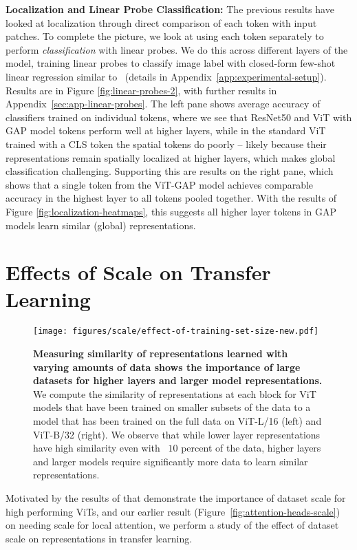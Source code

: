 \documentclass{article}
\begin{document}
\textbf{Localization and Linear Probe Classification:}
The previous results have looked at localization through direct comparison of each token with input patches. To complete the picture, we look at using each token separately to perform \textit{classification} with linear probes. We do this across different layers of the model, training linear probes to classify image label with closed-form few-shot linear regression similar to~\citet{dosovitskiy2020image} (details in Appendix~\ref{app:experimental-setup}). Results are in Figure \ref{fig:linear-probes-2}, with further results in Appendix~\ref{sec:app-linear-probes}.
The left pane shows average accuracy of classifiers trained on individual tokens, where we see that ResNet50 and ViT with GAP model tokens perform well at higher layers, while in the standard ViT trained with a CLS token the spatial tokens do poorly -- likely because their representations remain spatially localized at higher layers, which makes global classification challenging. Supporting this are results on the right pane, which shows that a single token from the ViT-GAP model achieves comparable accuracy in the highest layer to all tokens pooled together. With the results of Figure \ref{fig:localization-heatmaps}, this suggests all higher layer tokens in GAP models learn similar (global) representations.

\vspace{-0.75em}
\section{Effects of Scale on Transfer Learning}
\vspace{-0.25em}
\label{sec:transfer-learning}
\begin{figure}
    \centering
    \texttt{[image: figures/scale/effect-of-training-set-size-new.pdf]} 
    \vspace{-0.5em}
    \caption{\small \textbf{Measuring similarity of representations learned with varying amounts of data shows the importance of large datasets for higher layers and larger model representations.} We compute the similarity of representations at each block for ViT models that have been trained on smaller subsets of the data to a model that has been trained on the full data on ViT-L/16 (left) and ViT-B/32 (right). We observe that while lower layer representations have high similarity even with ~$10$ percent of the data, higher layers and larger models require significantly more data to learn similar representations.}
    \label{fig:training-set-size}
    \vspace{-1em}
\end{figure}
Motivated by the results of \citet{dosovitskiy2020image} that demonstrate the importance of dataset scale for high performing ViTs, and our earlier result (Figure~\ref{fig:attention-heads-scale}) on needing scale for local attention, we perform a study of the effect of dataset scale on representations in transfer learning.
\end{document}
